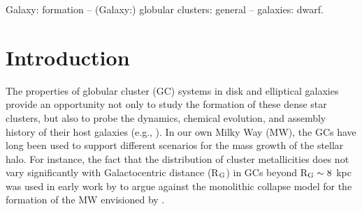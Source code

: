 \documentclass[useAMS,usenatbib]{mn2e}
\newcommand\msol{{{\cal M}_\odot}}
\begin{document}
\begin{abstract}
\end{abstract}

\begin{keywords}
Galaxy: formation -- (Galaxy:) globular clusters: general -- galaxies: dwarf.
\end{keywords}

\section{Introduction}
The properties of globular cluster (GC) systems in disk and elliptical galaxies
provide an opportunity not only to study the formation of these dense star
clusters, but also to probe the dynamics, chemical evolution, and assembly
history of their host galaxies (e.g., \citealt{Pota13}).  In our own Milky Way
(MW), the GCs have long been used to support different scenarios for the mass
growth of the stellar halo.  For instance, the fact that the distribution of
cluster metallicities does not vary significantly with Galactocentric distance
(R$_{\rm G}$) in GCs beyond R$_{\rm G} \sim 8$ kpc was used in early work by
\cite{SZ78} to argue against the monolithic collapse model for the formation
of the MW envisioned by \cite{ELS62}.
\end{document}
